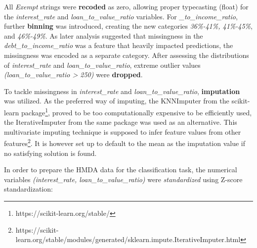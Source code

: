 All \textit{Exempt} strings were \textbf{recoded} as zero, allowing proper typecasting (float) for the \textit{interest\_rate} and \textit{loan\_to\_value\_ratio} variables. 
For \textit{\_to\_income\_ratio}, further \textbf{binning} was introduced, creating the new categories \textit{36\%-41\%, 41\%-45\%}, and \textit{46\%-49\%}. %
As later analysis suggested that missingness in the \textit{debt\_to\_income\_ratio} was a feature that heavily impacted predictions, the missingness was encoded as a separate category.
After assessing the distributions of \textit{interest\_rate} and \textit{loan\_to\_value\_ratio}, extreme outlier values \textit{(loan\_to\_value\_ratio > 250)} were \textbf{dropped}. 

To tackle missingness in \textit{interest\_rate} and \textit{loan\_to\_value\_ratio}, \textbf{imputation} was utilized. 
As the preferred way of imputing, the KNNImputer from the scikit-learn package\footnote{https://scikit-learn.org/stable/}, proved to be too computationally expensive to be efficiently used, the IterativeImputer from the same package was used as an alternative. 
This multivariate imputing technique is supposed to infer feature values from other features\footnote{https://scikit-learn.org/stable/modules/generated/sklearn.impute.IterativeImputer.html}. It is however set up to default to the mean as the imputation value if no satisfying solution is found.%

In order to prepare the HMDA data for the classification task, the numerical variables \textit{(interest\_rate, loan\_to\_value\_ratio)} were \textit{standardized} using Z-score standardization: 

